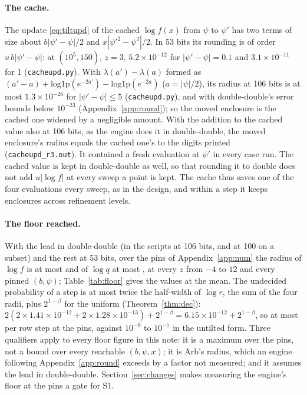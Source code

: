 \paragraph{The cache.} The update \eqref{eq:tiltupd} of the cached $\log f(x)$ from $\psi$ to $\psi'$ has two
terms of size about $b|\psi'-\psi|/2$ and $x|\psi'^2-\psi^2|/2$. In 53 bits its rounding is of order
$u\,b|\psi'-\psi|$: at $(10^5,150)$, $z=3$, $5.2\times10^{-12}$ for $|\psi'-\psi|=0.1$ and $3.1\times10^{-11}$ for 1
(\texttt{cacheupd.py}). With $\lambda(a')-\lambda(a)$ formed as $(a'-a)+\mathrm{log1p}(e^{-2a'})-\mathrm{log1p}(e^{-2a})$ ($a=|\psi|/2$),
its radius at 106 bits is at most $1.3\times10^{-26}$ for $|\psi'-\psi|\le5$ (\texttt{cacheupd.py}), and with
double-double's error bounds below $10^{-23}$ (Appendix~\ref{app:round}); so the moved enclosure is the cached
one widened by a negligible amount. With the addition to the cached value also at 106 bits, as the engine does it
in double-double, the moved enclosure's radius equals the cached one's to the digits printed
(\texttt{cacheupd\_r3.out}). It contained a fresh evaluation at $\psi'$ in every case run. The cached value is kept in double-double as well, so that rounding it to
double does not add $u|\log f|$ at every sweep a point is kept. The cache thus saves one of the four evaluations
every sweep, as in the design, and within a step it keeps enclosures across refinement levels.

\paragraph{The floor reached.} With the lead in double-double (in the scripts at 106 bits, and at 100 on a subset)
and the rest at 53 bits, over the pins of Appendix~\ref{app:num} the radius of $\log f$ is at most \FLOORFALL{}
and of $\log q$ at most \FLOORQALL{}, at every $z$ from $-4$ to $12$ and every pinned $(b,\psi)$;
Table~\ref{tab:floor} gives the values at the mean. The undecided probability of a step is at most twice the
half-width of $\log r$, the sum of the four radii, plus $2^{1-\beta}$ for the uniform (Theorem~\ref{thm:dec}):
$2(2\times1.41\times10^{-12}+2\times1.28\times10^{-13})+2^{1-\beta}=6.15\times10^{-12}+2^{1-\beta}$, so at most
\FLOORSTEP{} per row step at the pins, against $10^{-9}$ to $10^{-7}$ in the untilted form. Three qualifiers apply
to every floor figure in this note: it is a maximum over the pins, not a bound over every reachable $(b,\psi,x)$;
it is Arb's radius, which an engine following Appendix~\ref{app:round} exceeds by a factor not measured; and it
assumes the lead in double-double. Section~\ref{sec:changes} makes measuring the engine's floor at the pins a
gate for S1.

